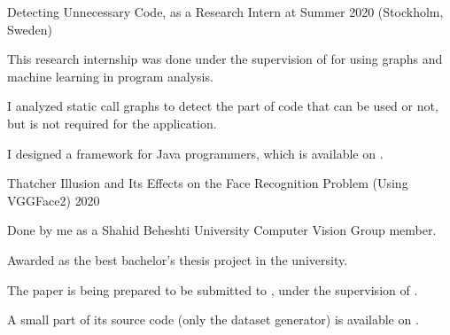 

\begin{cvprojects}

  \cvproject
    {Detecting Unnecessary Code, as a Research Intern at }
    {}
    {}
    {Summer 2020 (Stockholm, Sweden)}
    {
      \begin{cvitems} %
        \item {This research internship was done under the supervision of  for using graphs and machine learning in program analysis.}
        \item {I analyzed static call graphs to detect the part of code that can be used or not, but is not required for the application.}
        \item {I designed a framework for Java programmers, which is available on .}
      \end{cvitems}
    }

  \cvproject
    {Thatcher Illusion and Its Effects on the Face Recognition Problem (Using VGGFace2)} %
    {} %
    {} %
    {2020} %
    {
      \begin{cvitems} %
        \item {Done by me as a Shahid Beheshti University Computer Vision Group member.}
        \item {Awarded as the best bachelor's thesis project in the university.}
        \item {The paper is being prepared to be submitted to , under the supervision of .}
        \item {A small part of its source code (only the dataset generator) is available on .}
      \end{cvitems}
    }


\end{cvprojects}
